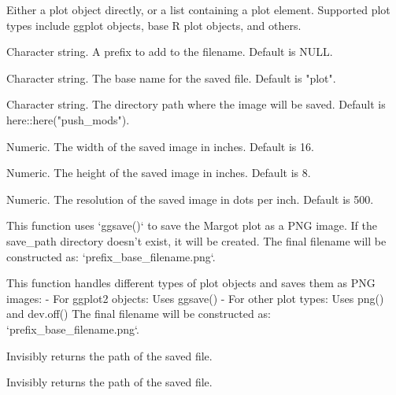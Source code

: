 \documentclass[a4paper]{book}
\begin{document}
%
\begin{Arguments}
\begin{ldescription}
\item[\code{plot\_output}] Either a plot object directly, or a list containing a plot element.
Supported plot types include ggplot objects, base R plot objects, and others.

\item[\code{prefix}] Character string. A prefix to add to the filename. Default is NULL.

\item[\code{base\_filename}] Character string. The base name for the saved file. Default is "plot".

\item[\code{save\_path}] Character string. The directory path where the image will be saved.
Default is here::here("push\_mods").

\item[\code{width}] Numeric. The width of the saved image in inches. Default is 16.

\item[\code{height}] Numeric. The height of the saved image in inches. Default is 8.

\item[\code{dpi}] Numeric. The resolution of the saved image in dots per inch. Default is 500.
\end{ldescription}
\end{Arguments}
%
\begin{Details}
This function uses `ggsave()` to save the Margot plot as a PNG image.
If the save\_path directory doesn't exist, it will be created.
The final filename will be constructed as: `prefix\_base\_filename.png`.

This function handles different types of plot objects and saves them as PNG images:
- For ggplot2 objects: Uses ggsave()
- For other plot types: Uses png() and dev.off()
The final filename will be constructed as: `prefix\_base\_filename.png`.
\end{Details}
%
\begin{Value}
Invisibly returns the path of the saved file.

Invisibly returns the path of the saved file.
\end{Value}
%
\end{document}
